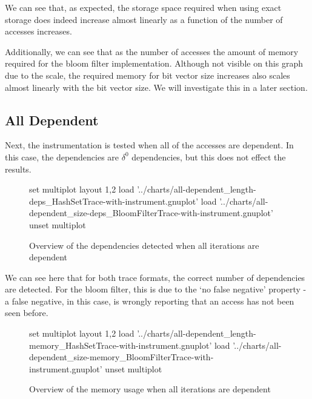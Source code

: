 	We can see that, as expected, the storage space required when using exact storage does indeed increase almost linearly as a function of the number of accesses increases.
	
	Additionally, we can see that as the number of accesses the amount of memory required for the bloom filter implementation. Although not visible on this graph due to the scale, the required memory for bit vector size increases also scales almost linearly with the bit vector size. We will investigate this in a later section.
	
	\subsection{All Dependent} \label{sec:result/basic/all-dep}
	Next, the instrumentation is tested when all of the accesses are dependent. In this case, the dependencies are $\delta^{0}$ dependencies, but this does not effect the results.
	
	\begin{figure}
		\centering
		\begin{gnuplot}[terminal=pdf]
			set multiplot layout 1,2
				load '../charts/all-dependent_length-deps_HashSetTrace-with-instrument.gnuplot'
				load '../charts/all-dependent_size-deps_BloomFilterTrace-with-instrument.gnuplot'		
			unset multiplot
		\end{gnuplot}
		\label{chart:all-dependent-deps-comparison}
		\caption{Overview of the dependencies detected when all iterations are dependent}
	\end{figure}
	
	We can see here that for both trace formats, the correct number of dependencies are detected. For the bloom filter, this is due to the `no false negative' property - a false negative, in this case, is wrongly reporting that an access has not been seen before.
	
	\begin{figure}
		\centering
		\begin{gnuplot}[terminal=pdf]
		set multiplot layout 1,2
			load '../charts/all-dependent_length-memory_HashSetTrace-with-instrument.gnuplot'
			load '../charts/all-dependent_size-memory_BloomFilterTrace-with-instrument.gnuplot'
					unset multiplot
		\end{gnuplot}
		\caption{Overview of the memory usage when all iterations are dependent}
		\label{chart:all-dependent-memory-comparison}
	\end{figure}
	
